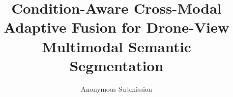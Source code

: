 \title{\bfseries Condition-Aware Cross-Modal Adaptive Fusion for Drone-View Multimodal Semantic Segmentation}
\author{Anonymous Submission}
\date{}
